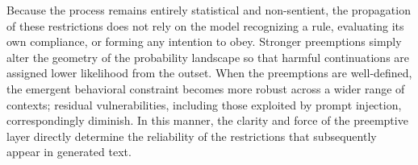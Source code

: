 Because the process remains entirely statistical and non-sentient, the propagation of these restrictions does not rely on the model recognizing a rule, evaluating its own compliance, or forming any intention to obey. Stronger preemptions simply alter the geometry of the probability landscape so that harmful continuations are assigned lower likelihood from the outset. When the preemptions are well-defined, the emergent behavioral constraint becomes more robust across a wider range of contexts; residual vulnerabilities, including those exploited by prompt injection, correspondingly diminish. In this manner, the clarity and force of the preemptive layer directly determine the reliability of the restrictions that subsequently appear in generated text.
